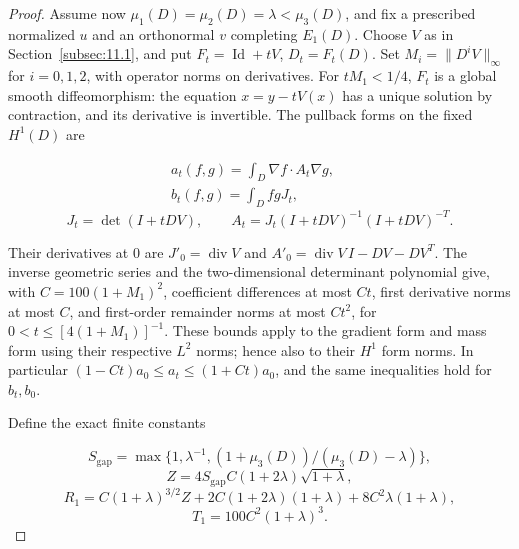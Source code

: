 \documentclass[11pt]{article}
\theoremstyle{definition}
\theoremstyle{remark}
\numberwithin{equation}{section}
\begin{document}
\begin{proof}

Assume now $\mu_1(D)=\mu_2(D)=\lambda<\mu_3(D)$, and fix a prescribed normalized $u$ and an orthonormal $v$ completing $E_1(D)$. Choose $V$ as in Section~\ref{subsec:11.1}, and put $F_t=\operatorname{Id}+tV$, $D_t=F_t(D)$. Set $M_i=\|D^iV\|_\infty$ for $i=0,1,2$, with operator norms on derivatives. For $tM_1<1/4$, $F_t$ is a global smooth diffeomorphism: the equation $x=y-tV(x)$ has a unique solution by contraction, and its derivative is invertible. The pullback forms on the fixed $H^1(D)$ are

\begin{equation}\label{eq:src-11-07}
\begin{gathered}
a_t(f,g)=\int_D\nabla f\cdot A_t\nabla g,\quad \\
b_t(f,g)=\int_Dfg J_t,
\end{gathered}
\end{equation}
\begin{equation}\label{eq:src-11-08}
J_t=\det(I+tDV),\qquad A_t=J_t(I+tDV)^{-1}(I+tDV)^{-T}.
\end{equation}

Their derivatives at 0 are $J'_0=\operatorname{div}V$ and $A'_0=\operatorname{div}V\,I-DV-DV^T$. The inverse geometric series and the two-dimensional determinant polynomial give, with $C=100(1+M_1)^2$, coefficient differences at most $Ct$, first derivative norms at most $C$, and first-order remainder norms at most $Ct^2$, for $0<t\le[4(1+M_1)]^{-1}$. These bounds apply to the gradient form and mass form using their respective $L^2$ norms; hence also to their $H^1$ form norms. In particular $(1-Ct)a_0\le a_t\le(1+Ct)a_0$, and the same inequalities hold for $b_t,b_0$.

Define the exact finite constants

\begin{equation}\label{eq:src-11-09}
S_{\mathrm{gap}}=\max\{1,\lambda^{-1},(1+\mu_3(D))/(\mu_3(D)-\lambda)\},
\end{equation}
\begin{equation}\label{eq:src-11-10}
Z=4S_{\mathrm{gap}}C(1+2\lambda)\sqrt{1+\lambda},
\end{equation}
\begin{equation}\label{eq:src-11-11}
R_1=C(1+\lambda)^{3/2}Z+2C(1+2\lambda)(1+\lambda)+8C^2\lambda(1+\lambda),
\end{equation}
\begin{equation}\label{eq:src-11-12}
T_1=100C^2(1+\lambda)^3.
\end{equation}


\end{proof}
\end{document}
